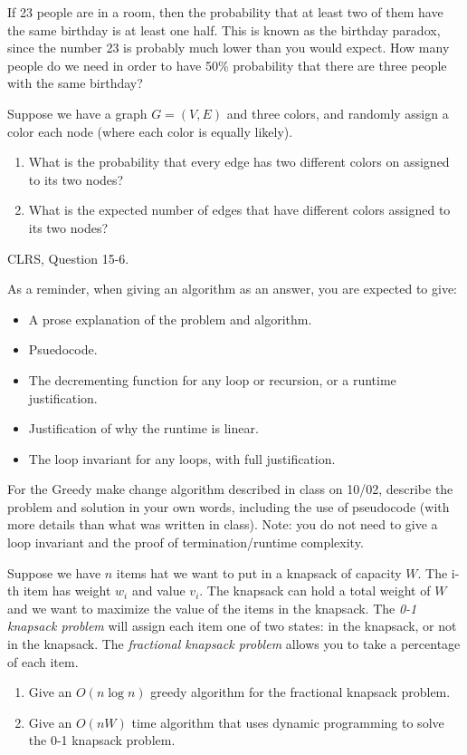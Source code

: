 \documentclass{article}
\author{TODO-Your Group Number and Names Here}
\date{due: 18 October 2019}
\begin{document}
\nextprob
If 23 people are in a room, then the probability that at least two of them have
the same birthday is at least one half.  This is known as the birthday paradox,
since the number 23 is probably much lower than you would expect.  How many
people do we need in order to have 50\% probability that there are three people
with the same birthday?


\nextprob
Suppose we have a graph $G=(V,E)$ and three colors, and randomly assign a color
each node (where each color is equally likely).
\begin{enumerate}
    \item What is the probability that every edge has two different colors on
        assigned to its two nodes?
    \item What is the expected number of edges that have different colors
        assigned to its two nodes?
\end{enumerate}

\nextprob
CLRS, Question 15-6.

As a reminder, when giving an algorithm as an answer, you
are expected to give:
\begin{itemize}
    \item A prose explanation of the problem and algorithm.
    \item Psuedocode.
    \item The decrementing function for any loop or recursion, or a runtime
        justification.
    \item Justification of why the runtime is linear.
    \item The loop invariant for any loops, with full justification.
\end{itemize}



\nextprob
For the Greedy make change algorithm described in class on 10/02, describe the
problem and solution in your own words, including the use of pseudocode (with
more details than what was written in class).  Note: you do not need to give a
loop invariant and the proof of termination/runtime complexity.

\nextprob
Suppose we have $n$ items hat we want to put in a knapsack of capacity $W$.  The i-th item has
weight $w_i$ and value $v_i$.  The knapsack can hold a total weight of $W$ and
we want to maximize the value of the items in the knapsack.
The \emph{0-1 knapsack problem} will assign each item one of two states: in the
knapsack, or not in the knapsack.  The \emph{fractional knapsack problem} allows
you to take a percentage of each item.
\begin{enumerate}
    \item Give an $O(n\log n)$ greedy algorithm for the fractional knapsack problem.
    \item Give an $O(nW)$ time algorithm that uses dynamic programming to solve
        the 0-1 knapsack problem.
\end{enumerate}
\end{document}
